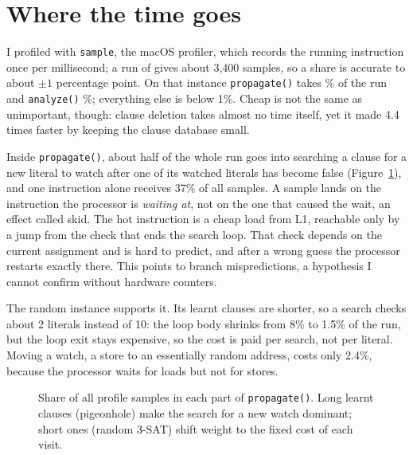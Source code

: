 \section{Where the time goes}
\label{sec:profile}

I profiled with \texttt{sample}, the macOS profiler, which records the running
instruction once per millisecond; a run of  gives about
3{,}400 samples, so a share is accurate to about $\pm 1$ percentage point. On
that instance \texttt{propagate()} takes \numPropagateShare\% of the run and
\texttt{analyze()} \numAnalyzeShare\%; everything else is below 1\%. Cheap is
not the same as unimportant, though: clause deletion takes almost no time
itself, yet it made  4.4 times faster by keeping the clause
database small.

Inside \texttt{propagate()}, about half of the whole run goes into searching a
clause for a new literal to watch after one of its watched literals has become
false (Figure~\ref{fig:regions}), and one instruction alone receives 37\% of
all samples. A sample lands on the instruction the processor is \emph{waiting
at}, not on the one that caused the wait, an effect called skid. The hot
instruction is a cheap load from L1, reachable only by a jump from the check
that ends the search loop. That check depends on the current assignment and is
hard to predict, and after a wrong guess the processor restarts exactly there.
This points to branch mispredictions, a hypothesis I cannot confirm without
hardware counters.

The random instance supports it. Its learnt clauses are shorter, so a search
checks about 2 literals instead of 10: the loop body shrinks from 8\% to
1.5\% of the run, but the loop exit stays expensive, so the cost is paid per
search, not per literal. Moving a watch, a store to an essentially random
address, costs only 2.4\%, because the processor waits for loads but not for
stores.

\begin{figure}[ht]
\centering
{}
\caption{Share of all profile samples in each part of \texttt{propagate()}.
Long learnt clauses (pigeonhole) make the search for a new watch dominant;
short ones (random 3-SAT) shift weight to the fixed cost of each visit.}
\label{fig:regions}
\end{figure}
